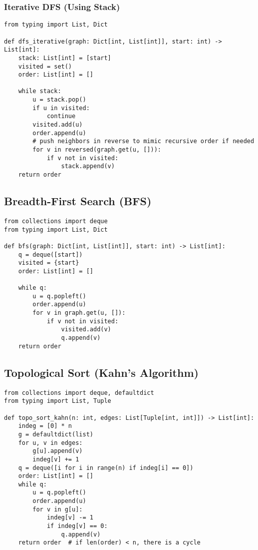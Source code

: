 \documentclass[11pt]{article}
\begin{document}
\subsubsection*{Iterative DFS (Using Stack)}
\begin{lstlisting}[style=py,caption={Iterative DFS}]
from typing import List, Dict

def dfs_iterative(graph: Dict[int, List[int]], start: int) -> List[int]:
    stack: List[int] = [start]
    visited = set()
    order: List[int] = []

    while stack:
        u = stack.pop()
        if u in visited:
            continue
        visited.add(u)
        order.append(u)
        # push neighbors in reverse to mimic recursive order if needed
        for v in reversed(graph.get(u, [])):
            if v not in visited:
                stack.append(v)
    return order
\end{lstlisting}

\subsection{Breadth-First Search (BFS)}
\begin{lstlisting}[style=py,caption={BFS for shortest layers in unweighted graphs}]
from collections import deque
from typing import List, Dict

def bfs(graph: Dict[int, List[int]], start: int) -> List[int]:
    q = deque([start])
    visited = {start}
    order: List[int] = []

    while q:
        u = q.popleft()
        order.append(u)
        for v in graph.get(u, []):
            if v not in visited:
                visited.add(v)
                q.append(v)
    return order
\end{lstlisting}

\subsection{Topological Sort (Kahn's Algorithm)}
\begin{lstlisting}[style=py,caption={Kahn's algorithm for DAGs}]
from collections import deque, defaultdict
from typing import List, Tuple

def topo_sort_kahn(n: int, edges: List[Tuple[int, int]]) -> List[int]:
    indeg = [0] * n
    g = defaultdict(list)
    for u, v in edges:
        g[u].append(v)
        indeg[v] += 1
    q = deque([i for i in range(n) if indeg[i] == 0])
    order: List[int] = []
    while q:
        u = q.popleft()
        order.append(u)
        for v in g[u]:
            indeg[v] -= 1
            if indeg[v] == 0:
                q.append(v)
    return order  # if len(order) < n, there is a cycle
\end{lstlisting}
\end{document}

